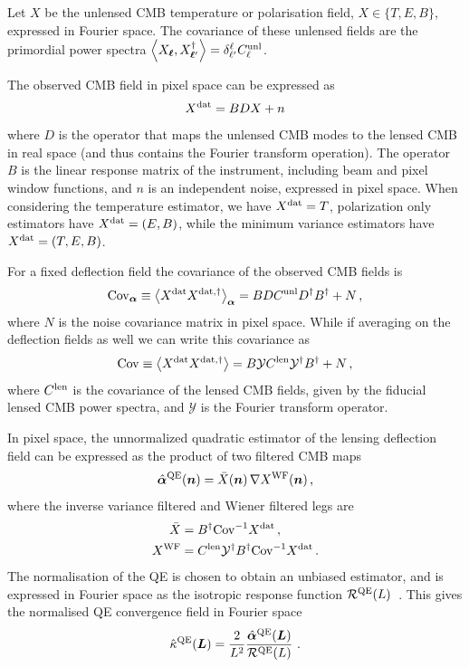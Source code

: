 \documentclass[prd, superscriptaddress, tightenlines, longbibliography, nofootinbib, eqsecnum, amsfonts, amsmath, floatfix, twocolumn, notitlepage]{revtex4-2}
\newcommand{\Cov}[0]{ {\rm{Cov}} }
\begin{document}
Let $X$ be the unlensed CMB temperature or polarisation field, $X \in \{T, E, B\}$, expressed in Fourier space.
The covariance of these unlensed fields are the primordial power spectra 
$\left<X_{{\boldsymbol{\ell}}}, X_{{\boldsymbol{\ell}}'}^\dagger \right> = \delta^{\ell}_{\ell'} C_\ell^{\rm unl}$.

The observed CMB field in pixel space can be expressed as 
\begin{equation}
    X^{\rm dat} = BDX + n
\end{equation}
where $D$ is the operator that maps the unlensed CMB modes to the lensed CMB in real space (and thus contains the Fourier transform operation). The operator $B$ is the linear response matrix of the instrument, including beam and pixel window functions, and $n$ is an independent noise, expressed in pixel space.
When considering the temperature estimator, we have $ X^{\rm dat} = T$, polarization only estimators have $ X^{\rm dat} = (E, B)$, while the minimum variance estimators have  $X^{\rm dat} = (T, E, B)$.

For a fixed deflection field the covariance of the observed CMB fields is
\begin{equation}
    \Cov_{\valpha} \equiv \left<X^{\rm dat} X^{\rm dat, \dagger} \right>_{\valpha}  = BDC^{\rm unl} D^\dagger B^\dagger + N \, ,
\end{equation}
where $N$ is the noise covariance matrix in pixel space. 
While if averaging on the deflection fields as well we can write this covariance as 
\begin{equation}
    \Cov \equiv \left<X^{\rm dat} X^{\rm dat, \dagger} \right> = B \mathcal{Y} C^{\rm len} \mathcal{Y}^\dagger B^\dagger + N \, ,
\end{equation}
where $C^{\rm len}$ is the covariance of the lensed CMB fields, given by the fiducial lensed CMB power spectra, and $\mathcal{Y}$ is the Fourier transform operator.

In pixel space, the unnormalized quadratic estimator of the lensing deflection field can be expressed as the product of two filtered CMB maps
\begin{equation}\label{Eq:QE}
    \hat {{\boldsymbol{\alpha}}}^{\rm QE}({\mbox{\boldmath{$n$}}}) = \bar X({\mbox{\boldmath{$n$}}}) \, \nabla X^{\rm WF}({\mbox{\boldmath{$n$}}}) \, ,
\end{equation}
where the inverse variance filtered and Wiener filtered legs are
\begin{equation}
    \begin{split}
        \bar X &= B^{\dagger} \Cov^{-1} X^{\rm dat} \, , \\
        X^{\rm WF} &= C^{\rm len}  \mathcal{Y}^\dagger B^{\dagger} \Cov^{-1} X^{\rm dat} \, .
    \end{split}
\end{equation}
The normalisation of the QE is chosen to obtain an unbiased estimator, and is expressed in Fourier space as the isotropic response function $\mathcal R^{\rm QE}(L)$~\cite{Hu:2001kj}.
This gives the normalised QE convergence field in Fourier space
\begin{equation}
    \hat \kappa^{\rm QE}({\mbox{\boldmath{$L$}}}) = \frac{2}{L^2} \frac{\hat {{\boldsymbol{\alpha}}}^{\rm QE}({\mbox{\boldmath{$L$}}})}{\mathcal R^{\rm QE}(L)} \,  \, .
\end{equation}
\end{document}
